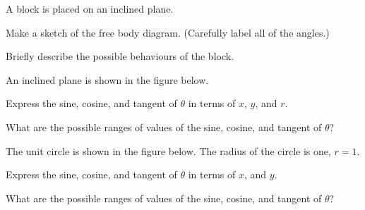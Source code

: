 \begin{problem}
\item A block is placed on an inclined plane.

  \scalebox{0.35}{}

  \begin{subproblem}
    \item Make a sketch of the free body diagram. (Carefully label all of the angles.)
      \vfill
      \vfill
    \item Briefly describe the possible behaviours of the block.
      \vfill
  \end{subproblem}

  \clearpage

\item An inclined plane is shown in the figure below.

  \scalebox{0.35}{}

  \begin{subproblem}
  \item Express the sine, cosine, and tangent of $\theta$ in terms of
    $x$, $y$, and $r$.
    \vfill
  \item What are the possible ranges of values of the sine, cosine, and tangent
    of $\theta$?
    \vspace{8em}
  \end{subproblem}

  \clearpage

\item The unit circle is shown in the figure below. The radius of the
  circle is one, $r=1$.

  \scalebox{0.35}{}

  \begin{subproblem}
  \item Express the sine, cosine, and tangent of $\theta$ in terms of
    $x$, and $y$.
    \vfill
  \item What are the possible ranges of values of the sine, cosine, and tangent
    of $\theta$?
    \vspace{8em}
  \end{subproblem}


\end{problem}

